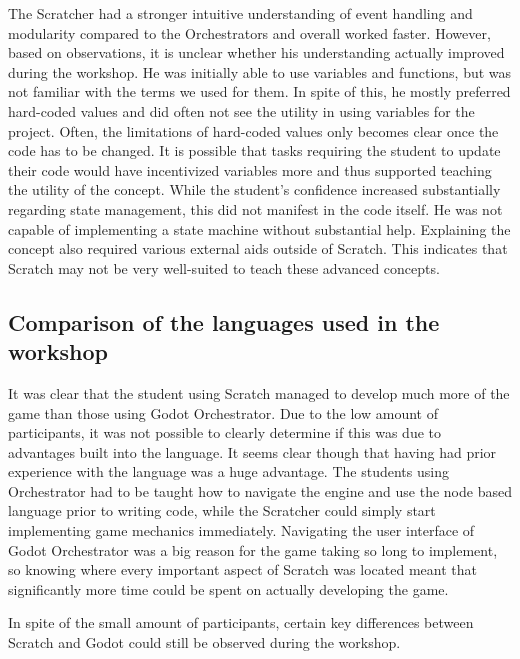 The Scratcher had a stronger intuitive understanding of event handling and modularity compared to the Orchestrators and overall worked faster. However, based on observations, it is unclear whether his understanding actually improved during the workshop. He was initially able to use variables and functions, but was not familiar with the terms we used for them. In spite of this, he mostly preferred hard-coded values and did often not see the utility in using variables for the project. Often, the limitations of hard-coded values only becomes clear once the code has to be changed. It is possible that tasks requiring the student to update their code would have incentivized variables more and thus supported teaching the utility of the concept. While the student's confidence increased substantially regarding state management, this did not manifest in the code itself. He was not capable of implementing a state machine without substantial help. Explaining the concept also required various external aids outside of Scratch. This indicates that Scratch may not be very well-suited to teach these advanced concepts.

\subsection{Comparison of the languages used in the workshop}
It was clear that the student using Scratch managed to develop much
more of the game than those using Godot Orchestrator.
Due to the low
amount of participants, it was not possible to clearly determine if
this was due to advantages built into the language.
It seems clear
though that having had prior experience with the language was a huge
advantage.
The students using Orchestrator had to be taught how to
navigate the engine and use the node based language prior to writing
code, while the Scratcher could simply start implementing game
mechanics immediately.
Navigating the user interface of Godot
Orchestrator was a big reason for the game taking so long to
implement, so knowing where every important aspect of Scratch was
located meant that significantly more time could be spent on actually
developing the game.

In spite of the small amount of participants, certain key differences
between Scratch and Godot could still be observed during the
workshop.

